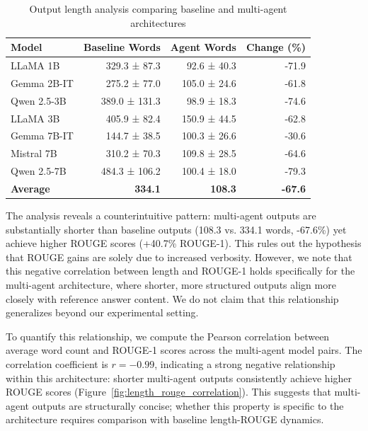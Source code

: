 \begin{table}[h]
\centering
\caption{Output length analysis comparing baseline and multi-agent architectures}
\label{tab:lengthanalysis}
\begin{tabular}{lrrr}
\toprule
\textbf{Model} & \textbf{Baseline Words} & \textbf{Agent Words} & \textbf{Change (\%)} \\
\midrule
LLaMA 1B & 329.3 ± 87.3 & 92.6 ± 40.3 & -71.9 \\
Gemma 2B-IT & 275.2 ± 77.0 & 105.0 ± 24.6 & -61.8 \\
Qwen 2.5-3B & 389.0 ± 131.3 & 98.9 ± 18.3 & -74.6 \\
LLaMA 3B & 405.9 ± 82.4 & 150.9 ± 44.5 & -62.8 \\
Gemma 7B-IT & 144.7 ± 38.5 & 100.3 ± 26.6 & -30.6 \\
Mistral 7B & 310.2 ± 70.3 & 109.8 ± 28.5 & -64.6 \\
Qwen 2.5-7B & 484.3 ± 106.2 & 100.4 ± 18.0 & -79.3 \\
\midrule
\textbf{Average} & \textbf{334.1} & \textbf{108.3} & \textbf{-67.6} \\
\bottomrule
\end{tabular}
\end{table}

The analysis reveals a counterintuitive pattern: multi-agent outputs are substantially shorter than baseline outputs (108.3 vs. 334.1 words, -67.6\%) yet achieve higher ROUGE scores (+40.7\% ROUGE-1). This rules out the hypothesis that ROUGE gains are solely due to increased verbosity. However, we note that this negative correlation between length and ROUGE-1 holds specifically for the multi-agent architecture, where shorter, more structured outputs align more closely with reference answer content. We do not claim that this relationship generalizes beyond our experimental setting.




To quantify this relationship, we compute the Pearson correlation between average word count and ROUGE-1 scores across the multi-agent model pairs. The correlation coefficient is $r = -0.99$, indicating a strong negative relationship within this architecture: shorter multi-agent outputs consistently achieve higher ROUGE scores (Figure~\ref{fig:length_rouge_correlation}). This suggests that multi-agent outputs are structurally concise; whether this property is specific to the architecture requires comparison with baseline length-ROUGE dynamics.

